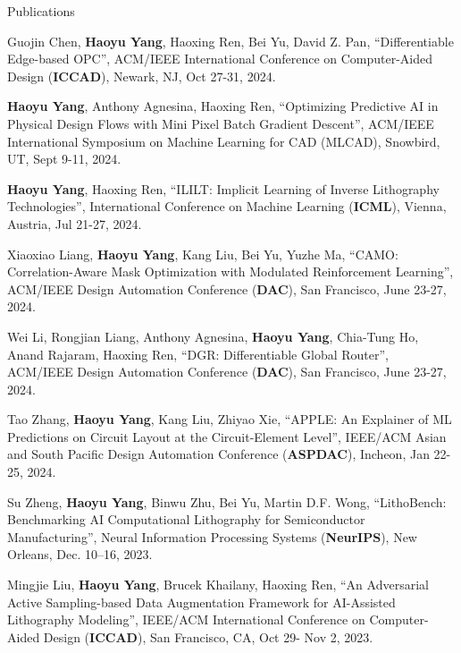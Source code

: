 \begin{rSection}{Publications}
\begin{description}[font=\normalfont]
	\item[{[C36]}] Guojin Chen, \textbf{Haoyu Yang}, Haoxing Ren, Bei Yu, David Z. Pan, ``Differentiable Edge-based OPC'', ACM/IEEE International Conference on Computer-Aided Design (\textbf{ICCAD}), Newark, NJ, Oct 27-31, 2024.
	
	\item[{[C35]}] \textbf{Haoyu Yang}, Anthony Agnesina, Haoxing Ren, ``Optimizing Predictive AI in Physical Design Flows with Mini Pixel Batch Gradient Descent'', ACM/IEEE International Symposium on Machine Learning for CAD (MLCAD), Snowbird, UT, Sept 9-11, 2024.
	
	\item[{[C34]}] \textbf{Haoyu Yang}, Haoxing Ren, ``ILILT: Implicit Learning of Inverse Lithography Technologies'', International Conference on Machine Learning (\textbf{ICML}), Vienna, Austria, Jul 21-27, 2024.
	
	\item[{[C33]}] Xiaoxiao Liang, \textbf{Haoyu Yang}, Kang Liu, Bei Yu, Yuzhe Ma, ``CAMO: Correlation-Aware Mask Optimization with Modulated Reinforcement Learning'', ACM/IEEE Design Automation Conference (\textbf{DAC}), San Francisco, June 23-27, 2024.
	
	\item[{[C32]}]	Wei Li, Rongjian Liang, Anthony Agnesina, \textbf{Haoyu Yang}, Chia-Tung Ho, Anand Rajaram, Haoxing Ren, ``DGR: Differentiable Global Router'', ACM/IEEE Design Automation Conference (\textbf{DAC}), San Francisco, June 23-27, 2024.
	
	\item[{[C31]}] Tao Zhang, \textbf{Haoyu Yang}, Kang Liu, Zhiyao Xie, ``APPLE: An Explainer of ML Predictions on Circuit Layout at the Circuit-Element Level'', IEEE/ACM Asian and South Pacific Design Automation Conference (\textbf{ASPDAC}), Incheon, Jan 22-25, 2024.
	
	
	\item[{[C30]}] Su Zheng, \textbf{Haoyu Yang}, Binwu Zhu, Bei Yu, Martin D.F. Wong, ``LithoBench: Benchmarking AI Computational Lithography for Semiconductor Manufacturing'', Neural Information Processing Systems (\textbf{NeurIPS}), New Orleans, Dec. 10–16, 2023.
	
		
	\item[{[C29]}] Mingjie Liu, \textbf{Haoyu Yang}, Brucek Khailany, Haoxing Ren, ``An Adversarial Active Sampling-based Data Augmentation Framework for AI-Assisted Lithography Modeling'', IEEE/ACM International Conference on Computer-Aided Design (\textbf{ICCAD}), San Francisco, CA, Oct 29- Nov 2, 2023.
	

\end{description}
\end{rSection}
